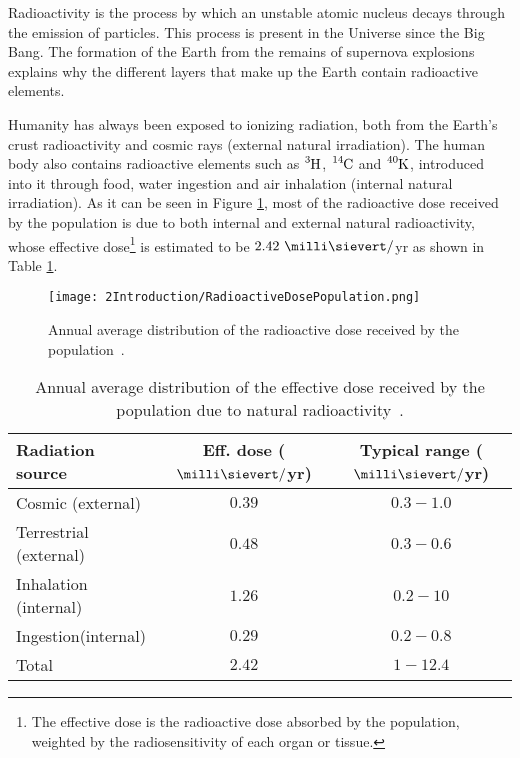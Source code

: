 Radioactivity is the process by which an unstable atomic nucleus decays through the emission of particles. This process is present in the Universe since the Big Bang. The formation of the Earth from the remains of supernova explosions explains why the different layers that make up the Earth contain radioactive elements. 

Humanity has always been exposed to ionizing radiation, both from the Earth's crust radioactivity and cosmic rays (external natural irradiation). The human body also contains radioactive elements such as $\ce{^{3}H}$, $\ce{^{14}C}$ and $\ce{^{40}K}$, introduced into it through food, water ingestion and air inhalation (internal natural irradiation). As it can be seen in Figure \ref{fig:RadioactiveDosePopulation}, most of the radioactive dose received by the population is due to both internal and external natural radioactivity, whose effective dose\footnote{The effective dose is the radioactive dose absorbed by the population, weighted by the radiosensitivity of each organ or tissue.} is estimated to be $2.42~\milli\sievert/$yr as shown in Table \ref{tab:RadioactiveNaturalDosePopulation}. 

\begin{figure}[h]
\texttt{[image: 2Introduction/RadioactiveDosePopulation.png]}
\centering
\caption{Annual average distribution of the radioactive dose received by the population~\cite{IAEA}\label{fig:RadioactiveDosePopulation}.}
\end{figure}

\begin{table}[h]
\centering{}%
\begin{tabular}{lcc}
\toprule 
Radiation source & Eff. dose ($\milli\sievert/$yr) & Typical range ($\milli\sievert/$yr)\tabularnewline
\midrule
\midrule 
Cosmic (external) & $0.39$ & $0.3 - 1.0$ \tabularnewline
Terrestrial (external) & $0.48$ & $0.3-0.6$ \tabularnewline  
Inhalation (internal) & $1.26$ & $0.2-10$ \tabularnewline
Ingestion(internal) & $0.29$ & $0.2-0.8$ \tabularnewline
\midrule
Total & $2.42$ & $1-12.4$ \tabularnewline
\bottomrule
\end{tabular}
\caption{Annual average distribution of the effective dose received by the population due to natural radioactivity~\cite{UNSCEAR, CSN}.}
\label{tab:RadioactiveNaturalDosePopulation}
\end{table}


